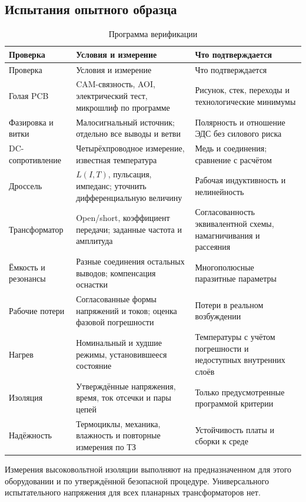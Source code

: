 \documentclass[14pt,a4paper]{extarticle}
\begin{document}
\subsection{Испытания опытного образца}
\begin{longtable}{>{\raggedright\arraybackslash}p{35mm}>{\raggedright\arraybackslash}p{69mm}>{\raggedright\arraybackslash}p{50mm}}
\caption{Программа верификации}\label{pl:tests}\\
\toprule Проверка & Условия и измерение & Что подтверждается\\\midrule\endfirsthead
\toprule Проверка & Условия и измерение & Что подтверждается\\\midrule\endhead
Голая PCB & CAM-связность, AOI, электрический тест, микрошлиф по программе & Рисунок, стек, переходы и технологические минимумы\\
Фазировка и витки & Малосигнальный источник; отдельно все выводы и ветви & Полярность и отношение ЭДС без силового риска\\
DC-сопротивление & Четырёхпроводное измерение, известная температура & Медь и соединения; сравнение с расчётом\\
Дроссель & $L(I,T)$, пульсация, импеданс; уточнить дифференциальную величину & Рабочая индуктивность и нелинейность\\
Трансформатор & Open/short, коэффициент передачи; заданные частота и амплитуда & Согласованность эквивалентной схемы, намагничивания и рассеяния\\
Ёмкость и резонансы & Разные соединения остальных выводов; компенсация оснастки & Многополюсные паразитные параметры\\
Рабочие потери & Согласованные формы напряжений и токов; оценка фазовой погрешности & Потери в реальном возбуждении\\
Нагрев & Номинальный и худшие режимы, установившееся состояние & Температуры с учётом погрешности и недоступных внутренних слоёв\\
Изоляция & Утверждённые напряжения, время, ток отсечки и пары цепей & Только предусмотренные программой критерии\\
Надёжность & Термоциклы, механика, влажность и повторные измерения по ТЗ & Устойчивость платы и сборки к среде\\
\bottomrule
\end{longtable}
Измерения высоковольтной изоляции выполняют на предназначенном для этого оборудовании и по утверждённой безопасной процедуре. Универсального испытательного напряжения для всех планарных трансформаторов нет.
\end{document}
